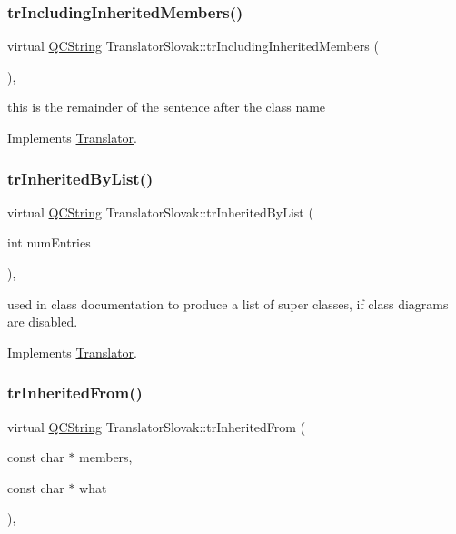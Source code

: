 \subsubsection{\texorpdfstring{trIncludingInheritedMembers()}{trIncludingInheritedMembers()}}
{\footnotesize\ttfamily virtual \mbox{\hyperlink{class_q_c_string}{Q\+C\+String}} Translator\+Slovak\+::tr\+Including\+Inherited\+Members (\begin{DoxyParamCaption}{ }\end{DoxyParamCaption})\hspace{0.3cm}{\ttfamily [inline]}, {\ttfamily [virtual]}}

this is the remainder of the sentence after the class name 

Implements \mbox{\hyperlink{class_translator}{Translator}}.

\mbox{\label{class_translator_slovak_abbfd240d209576152e425ea2c74460fd}} 
\subsubsection{\texorpdfstring{trInheritedByList()}{trInheritedByList()}}
{\footnotesize\ttfamily virtual \mbox{\hyperlink{class_q_c_string}{Q\+C\+String}} Translator\+Slovak\+::tr\+Inherited\+By\+List (\begin{DoxyParamCaption}\item[{int}]{num\+Entries }\end{DoxyParamCaption})\hspace{0.3cm}{\ttfamily [inline]}, {\ttfamily [virtual]}}

used in class documentation to produce a list of super classes, if class diagrams are disabled. 

Implements \mbox{\hyperlink{class_translator}{Translator}}.

\mbox{\label{class_translator_slovak_ad7a9af31583c515678a7c48646384b50}} 
\subsubsection{\texorpdfstring{trInheritedFrom()}{trInheritedFrom()}}
{\footnotesize\ttfamily virtual \mbox{\hyperlink{class_q_c_string}{Q\+C\+String}} Translator\+Slovak\+::tr\+Inherited\+From (\begin{DoxyParamCaption}\item[{const char $\ast$}]{members,  }\item[{const char $\ast$}]{what }\end{DoxyParamCaption})\hspace{0.3cm}{\ttfamily [inline]}, {\ttfamily [virtual]}}

